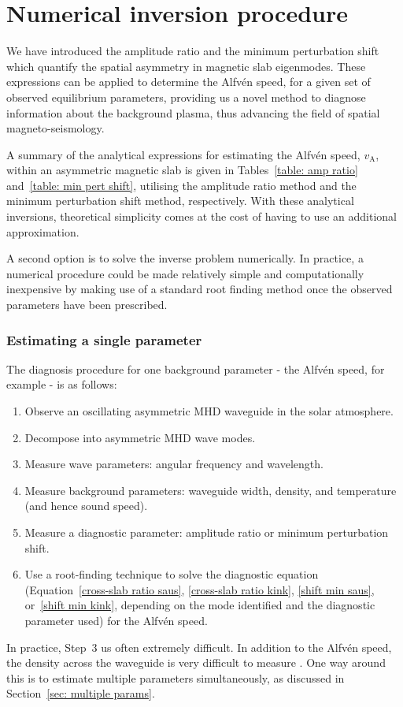 \documentclass[12pt]{../style-files/ociamthesis}
\begin{document}
\section{Numerical inversion procedure}
\label{sec: inversion}

We have introduced the amplitude ratio and the minimum perturbation shift which quantify the spatial asymmetry in magnetic slab eigenmodes. These expressions can be applied to determine the Alfv\'{e}n speed, for a given set of observed equilibrium parameters, providing us a novel method to diagnose information about the background plasma, thus advancing the field of spatial magneto-seismology.

A summary of the analytical expressions for estimating the Alfv\'{e}n speed, $v_\textrm{A}$, within an asymmetric magnetic slab is given in Tables~\ref{table: amp ratio} and~\ref{table: min pert shift}, utilising the amplitude ratio method and the minimum perturbation shift method, respectively. With these analytical inversions, theoretical simplicity comes at the cost of having to use an additional approximation.

A second option is to solve the inverse problem numerically. In practice, a numerical procedure could be made relatively simple and computationally inexpensive by making use of a standard root finding method once the observed parameters have been prescribed.


\subsubsection{Estimating a single parameter} \label{sec: single param}

The diagnosis procedure for one background parameter - the Alfv\'{e}n speed, for example - is as follows:
\begin{enumerate}
	\item Observe an oscillating asymmetric MHD waveguide in the solar atmosphere.
	\item Decompose into asymmetric MHD wave modes.
	\item Measure wave parameters: angular frequency and wavelength.
	\item Measure background parameters: waveguide width, density, and temperature (and hence sound speed).
	\item Measure a diagnostic parameter: amplitude ratio or minimum perturbation shift.
	\item Use a root-finding technique to solve the diagnostic equation (Equation~\eqref{cross-slab ratio saus}, \eqref{cross-slab ratio kink}, \eqref{shift min saus}, or~\eqref{shift min kink}, depending on the mode identified and the diagnostic parameter used) for the Alfv\'{e}n speed.
\end{enumerate}
In practice, Step~3 us often extremely difficult. In addition to the Alfv\'{e}n speed, the density across the waveguide is very difficult to measure \citep{war_etal09}. One way around this is to estimate multiple parameters simultaneously, as discussed in Section~\ref{sec: multiple params}.
\end{document}
